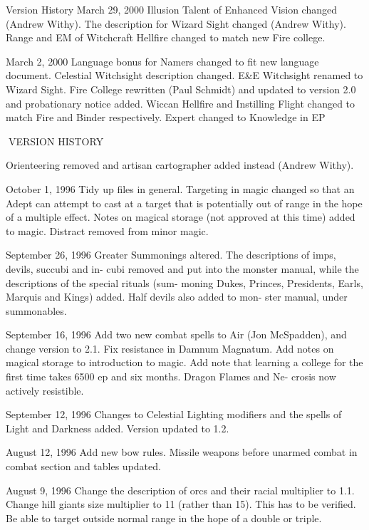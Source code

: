 \begin{Chapter}{Version History}
March 29, 2000 Illusion Talent of Enhanced Vision 
changed  (Andrew  Withy).  The  description  for 
Wizard Sight changed (Andrew Withy). Range and 
EM  of  Witchcraft  Hellfire  changed  to  match  new 
Fire college. 

March  2,  2000  Language  bonus  for  Namers 
changed  to  fit  new  language  document.  Celestial 
Witchsight  description  changed.  E\&E  Witchsight 
renamed  to  Wizard  Sight.  Fire  College  rewritten 
(Paul  Schmidt)  and  updated  to  version  2.0  and 
probationary  notice  added.  Wiccan  Hellfire  and 
Instilling Flight changed to match Fire and Binder 
respectively.  Expert  changed  to  Knowledge  in  EP 

VERSION HISTORY 

Orienteering  removed  and  artisan  cartographer 
added instead (Andrew Withy). 

October 1, 1996 Tidy up files in general. Targeting 
in  magic  changed  so  that  an  Adept  can  attempt  to 
cast at a target that is potentially out of range in the 
hope of a multiple effect. Notes on magical storage 
(not approved at this time) added to magic. Distract 
removed from minor magic. 

September  26,  1996  Greater  Summonings  altered. 
The  descriptions  of  imps,  devils,  succubi  and  in-
cubi  removed  and  put  into  the  monster  manual, 
while  the  descriptions  of  the  special  rituals  (sum-
moning Dukes, Princes, Presidents, Earls, Marquis 
and  Kings)  added.  Half  devils  also  added  to  mon-
ster manual, under summonables. 

September 16, 1996 Add two new combat spells to 
Air  (Jon  McSpadden),  and  change  version  to  2.1. 
Fix  resistance  in  Damnum  Magnatum.  Add  notes 
on  magical  storage  to  introduction  to  magic.  Add 
note that learning a college for the first time takes 
6500  ep  and  six  months.  Dragon  Flames  and  Ne-
crosis now actively resistible. 

September 12, 1996 Changes to Celestial Lighting 
modifiers  and  the  spells  of  Light  and  Darkness 
added. Version updated to 1.2. 

August  12,  1996  Add  new  bow  rules.  Missile 
weapons before unarmed combat in combat section 
and tables updated. 

August 9, 1996 Change the description of orcs and 
their racial multiplier to 1.1. Change hill giants size 
multiplier  to  11  (rather  than  15).  This  has  to  be 
verified.  Be  able  to  target  outside  normal  range  in 
the hope of a double or triple. 


\end{Chapter}

